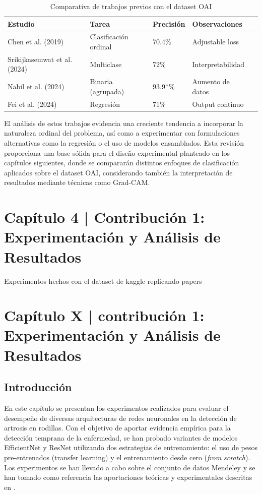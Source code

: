\documentclass[11pt,spanish,listoffigures,listoftables]{tfgetsinf}
\begin{document}
\begin{table}[h]
    \centering
    \caption{Comparativa de trabajos previos con el dataset OAI}
    \label{tab:comparative_oai}
    \begin{tabular}{lllll}
        \toprule
        \textbf{Estudio} & \textbf{Tarea} & \textbf{Precisión} & \textbf{Observaciones} \\
        \midrule
        Chen et al. (2019) & Clasificación ordinal & 70.4\% & Adjustable loss \\
        Srikijkasemwat et al. (2024) & Multiclase & 72\% & Interpretabilidad \\
        Nabil et al. (2024)  & Binaria (agrupada) & 93.9*\%  & Aumento de datos \\
        Fei et al. (2024)  & Regresión & 71\% & Output continuo \\
        \bottomrule
    \end{tabular}
\end{table}

El análisis de estos trabajos evidencia una creciente tendencia a incorporar la naturaleza ordinal del problema, así como a experimentar 
con formulaciones alternativas como la regresión o el uso de modelos ensamblados. Esta revisión proporciona una base sólida para el diseño 
experimental planteado en los capítulos siguientes, donde se compararán distintos enfoques de clasificación aplicados sobre el dataset OAI, 
considerando también la interpretación de resultados mediante técnicas como Grad-CAM.



\chapter{Capítulo 4 | Contribución 1: Experimentación y Análisis de Resultados}
\label{chap:experiments}

Experimentos hechos con el dataset de kaggle replicando papers

\chapter{Capítulo X | contribución 1: Experimentación y Análisis de Resultados}

\section{Introducción}
En este capítulo se presentan los experimentos realizados para evaluar el desempeño de diversas arquitecturas de redes neuronales en la detección de artrosis en rodillas. Con el objetivo de aportar evidencia empírica para la detección temprana de la enfermedad, se han probado variantes de modelos EfficientNet y ResNet utilizando dos estrategias de entrenamiento: el uso de pesos pre-entrenados (transfer learning) y el entrenamiento desde cero (\textit{from scratch}). Los experimentos se han llevado a cabo sobre el conjunto de datos Mendeley \cite{chen2018knee} y se han tomado como referencia las aportaciones teóricas y experimentales descritas en \cite{efficientnet_paper}. 
\end{document}
